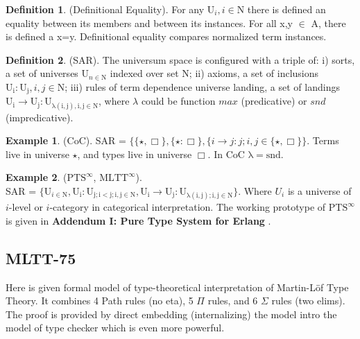 \documentclass{article}
\theoremstyle{definition}
\newtheorem{definition}{Definition}
\newtheorem{example}{Example}
\begin{document}
\begin{definition} (Definitional Equality). For any $\mathrm{U}_i, i \in \mathrm{N}$ there is
defined an equality between its members and between its instances.
For all x,y $\in$ A, there is defined a x=y. Definitional equality
compares normalized term instances.
\end{definition}

\begin{definition} (SAR). The universum space is configured with a triple of:
i) sorts, a set of universes  $\mathrm{U}_{n \in \mathrm{N}}$ indexed over set N;
ii) axioms, a set of inclusions {\bf $\mathrm{U_i : U_j}, i,j \in \mathrm{N}$};
iii) rules of term dependence universe landing, a set of landings
$\mathrm{U_i} \rightarrow \mathrm{U_j} : \mathrm{U_{\lambda(i,j), i,j \in \mathrm{N}}}$, where $\lambda$ could be function $max$ (predicative) or $snd$ (impredicative).
\end{definition}

\begin{example} (CoC). SAR = $\{ \{\star , \Box \},\{ \star : \Box \},
        \{ i \rightarrow j : j; i, j \in \{ \star, \Box \}
        \}$. Terms live in universe $\star$, and types live in universe $\Box$. In CoC $\mathrm{\lambda=snd}$.
\end{example}

\begin{example} ($\mathrm{PTS}^\infty$, $\mathrm{MLTT}^\infty$).\\ SAR = $\{ \mathrm{U}_{i \in \mathrm{N}},
    \mathrm{U_i : U_{j; i < j; i,j \in N}},
    \mathrm{U_i} \rightarrow \mathrm{U_j} : \mathrm{U_{\lambda(i,j); i,j \in \mathrm{N}}}
    \}$. Where $U_i$ is a universe of $i$-level or $i$-category in categorical interpretation.
    The working prototype of $\mathrm{PTS}^\infty$ is given in
    {\bf Addendum I: Pure Type System for Erlang} \cite{Tonpa18}.
\end{example}


\newpage
\subsection{MLTT-75}

Here is given formal model of type-theoretical interpretation of Martin-Löf Type Theory.
It combines 4 Path rules (no eta), 5 $\Pi$ rules, and 6 $\Sigma$ rules (two elims).
The proof is provided by direct embedding (internalizing) the model intro the model
of type checker which is even more powerful.
\end{document}
